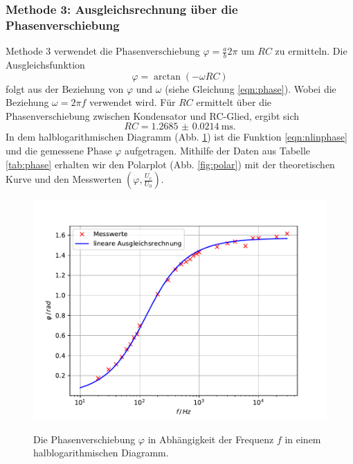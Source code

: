 \subsubsection{Methode 3: Ausgleichsrechnung über die Phasenverschiebung}
Methode 3 verwendet die Phasenverschiebung $\varphi = \frac{a}{b}2\pi$ um $RC$ zu ermitteln.
Die Ausgleichsfunktion
\begin{equation}
    \varphi = \arctan(-\omega RC)
    \label{eqn:nlinphase}
\end{equation}
folgt aus der Beziehung von $\varphi$ und $\omega$ (siehe Gleichung \ref{eqn:phase}).
Wobei die Beziehung $\omega = 2\pi f$ verwendet wird.
Für $RC$ ermittelt über die Phasenverschiebung zwischen Kondensator und RC-Glied, ergibt sich
\begin{equation*}
    RC = \SI{1.2685(214)}{\milli\second} .
\end{equation*}
In dem halblogarithmischen Diagramm (Abb. \ref{fig:phase}) ist die Funktion \ref{eqn:nlinphase} und die gemessene Phase $\varphi$ aufgetragen.
Mithilfe der Daten aus Tabelle \ref{tab:phase} erhalten wir den Polarplot (Abb. \ref{fig:polar}) mit der theoretischen Kurve und den Messwerten $(\varphi, \frac{U_\text{c}}{U_0})$.
\begin{figure}
    \centering
    \includegraphics[width=\textwidth]{content/data/plotc.pdf}
    \label{fig:phase}
    \caption{Die Phasenverschiebung $\varphi$ in Abhängigkeit der Frequenz $f$ in einem halblogarithmischen Diagramm.}
\end{figure}

